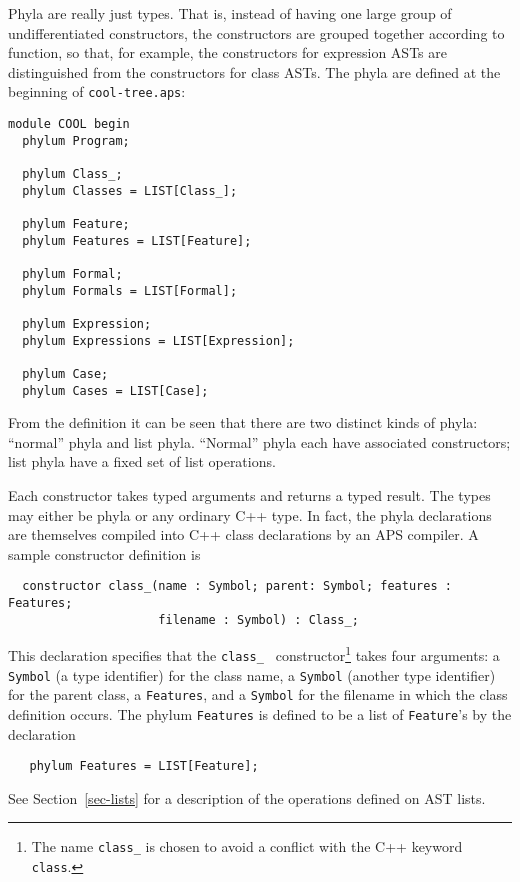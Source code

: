 Phyla are really just types.  That is, instead of having one large
group of undifferentiated constructors, the constructors are grouped
together according to function, so that, for example, the constructors
for expression ASTs are distinguished from the
constructors for class ASTs.  The phyla are defined at the
beginning of {\tt cool-tree.aps}:
\begin{verbatim}
module COOL begin
  phylum Program;

  phylum Class_;
  phylum Classes = LIST[Class_];

  phylum Feature;
  phylum Features = LIST[Feature];

  phylum Formal;
  phylum Formals = LIST[Formal];

  phylum Expression;
  phylum Expressions = LIST[Expression];

  phylum Case;
  phylum Cases = LIST[Case];

\end{verbatim}

From the definition it can be seen that there are two distinct kinds of
phyla: ``normal'' phyla and list phyla.  ``Normal'' phyla each have 
associated constructors; list phyla have a fixed set of list operations.

Each constructor takes typed arguments and returns a typed result.  The types
may either be phyla or any ordinary C++ type.  In fact, the phyla declarations
are themselves compiled into C++ class declarations by an APS compiler.
A sample constructor definition is
\begin{verbatim}
  constructor class_(name : Symbol; parent: Symbol; features : Features;
                     filename : Symbol) : Class_;
\end{verbatim}
This declaration specifies that the {\tt class\_\ } constructor\footnote{The name
 {\tt class\_} is chosen to avoid a conflict with the C++ keyword {\tt class}.} takes four
arguments: a {\tt Symbol} (a type identifier) for the class name, a
{\tt Symbol} (another type identifier) for the parent class, a
{\tt Features}, and a {\tt Symbol} for the filename in which the class definition
occurs.  The phylum {\tt Features} is defined to be a list of {\tt Feature}'s
by the declaration
\begin{verbatim}
   phylum Features = LIST[Feature];
\end{verbatim}
See Section~\ref{sec-lists} for a description of the operations defined on
AST lists.

